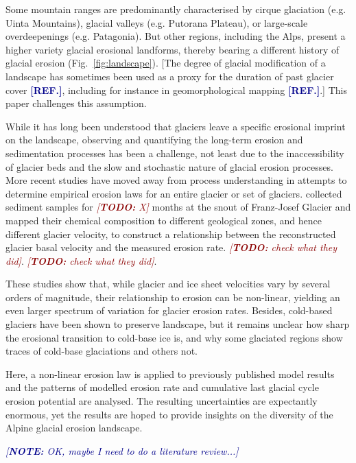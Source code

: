 \documentclass[utf8]{article}
\newcommand{\note}[1]{\textcolor{darkblue}{\emph{[\textbf{NOTE:} #1]}}}
\newcommand{\todo}[1]{\textcolor{darkred}{\emph{[\textbf{TODO:} #1]}}}
\newcommand{\aref}[0]{\textcolor{darkblue}{\textbf{[REF.]}}}
\begin{document}
    Some mountain ranges are predominantly characterised by cirque glaciation
    (e.g. Uinta Mountains), glacial valleys (e.g. Putorana Plateau), or
    large-scale overdeepenings (e.g. Patagonia). But other regions, including
    the Alps, present a higher variety glacial erosional landforms, thereby
    bearing a different history of glacial erosion (Fig.~\ref{fig:landscape}).
    [The degree of glacial modification of a landscape has sometimes been used
    as a proxy for the duration of past glacier cover \aref, including for
    instance in geomorphological mapping \aref.] This paper challenges this
    assumption.

    While it has long been understood that glaciers leave a specific erosional
    imprint on the landscape, observing and quantifying the long-term erosion
    and sedimentation processes has been a challenge, not least due to the
    inaccessibility of glacier beds and the slow and stochastic nature of
    glacial erosion processes. More recent studies have moved away from process
    understanding in attempts to determine empirical erosion laws for an entire
    glacier or set of glaciers. \citet{Herman.etal.2015} collected sediment
    samples for \todo{X} months at the snout of Franz-Josef Glacier and mapped
    their chemical composition to different geological zones, and hence
    different glacier velocity, to construct a relationship between the
    reconstructed glacier basal velocity and the measured erosion rate.
    \citet{Koppes.etal.2015} \todo{check what they did}. \citet{Cook.etal.2020}
    \todo{check what they did}.

    These studies show that, while glacier and ice sheet velocities vary by
    several orders of magnitude, their relationship to erosion can be
    non-linear, yielding an even larger spectrum of variation for glacier
    erosion rates. Besides, cold-based glaciers have been shown to preserve
    landscape, but it remains unclear how sharp the erosional transition to
    cold-base ice is, and why some glaciated regions show traces of cold-base
    glaciations and others not.

    Here, a non-linear erosion law is applied to previously published model
    results and the patterns of modelled erosion rate and cumulative
    last glacial cycle erosion potential are analysed. The resulting
    uncertainties are expectantly enormous, yet the results are hoped to
    provide insights on the diversity of the Alpine glacial erosion landscape.

    \note{OK, maybe I need to do a literature review...}
\end{document}
